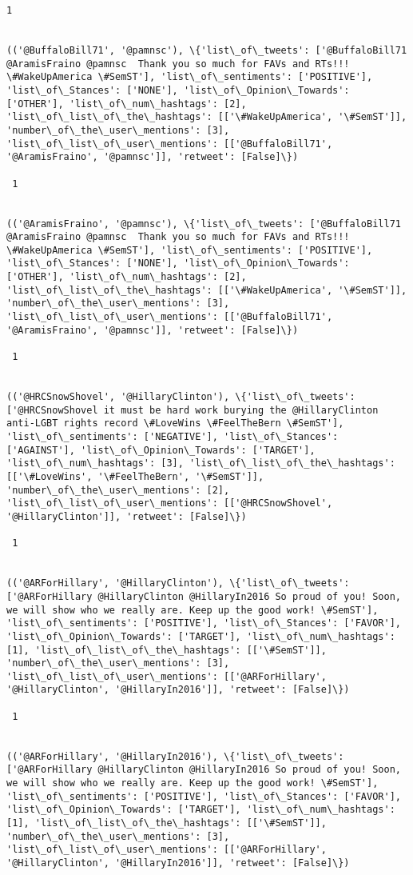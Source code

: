 \documentclass[11pt]{article}
\begin{document}
\begin{Verbatim}[commandchars=\\\{\}]
 1
 

(('@BuffaloBill71', '@pamnsc'), \{'list\_of\_tweets': ['@BuffaloBill71 @AramisFraino @pamnsc  Thank you so much for FAVs and RTs!!! \#WakeUpAmerica \#SemST'], 'list\_of\_sentiments': ['POSITIVE'], 'list\_of\_Stances': ['NONE'], 'list\_of\_Opinion\_Towards': ['OTHER'], 'list\_of\_num\_hashtags': [2], 'list\_of\_list\_of\_the\_hashtags': [['\#WakeUpAmerica', '\#SemST']], 'number\_of\_the\_user\_mentions': [3], 'list\_of\_list\_of\_user\_mentions': [['@BuffaloBill71', '@AramisFraino', '@pamnsc']], 'retweet': [False]\})

 1
 

(('@AramisFraino', '@pamnsc'), \{'list\_of\_tweets': ['@BuffaloBill71 @AramisFraino @pamnsc  Thank you so much for FAVs and RTs!!! \#WakeUpAmerica \#SemST'], 'list\_of\_sentiments': ['POSITIVE'], 'list\_of\_Stances': ['NONE'], 'list\_of\_Opinion\_Towards': ['OTHER'], 'list\_of\_num\_hashtags': [2], 'list\_of\_list\_of\_the\_hashtags': [['\#WakeUpAmerica', '\#SemST']], 'number\_of\_the\_user\_mentions': [3], 'list\_of\_list\_of\_user\_mentions': [['@BuffaloBill71', '@AramisFraino', '@pamnsc']], 'retweet': [False]\})

 1
 

(('@HRCSnowShovel', '@HillaryClinton'), \{'list\_of\_tweets': ['@HRCSnowShovel it must be hard work burying the @HillaryClinton anti-LGBT rights record \#LoveWins \#FeelTheBern \#SemST'], 'list\_of\_sentiments': ['NEGATIVE'], 'list\_of\_Stances': ['AGAINST'], 'list\_of\_Opinion\_Towards': ['TARGET'], 'list\_of\_num\_hashtags': [3], 'list\_of\_list\_of\_the\_hashtags': [['\#LoveWins', '\#FeelTheBern', '\#SemST']], 'number\_of\_the\_user\_mentions': [2], 'list\_of\_list\_of\_user\_mentions': [['@HRCSnowShovel', '@HillaryClinton']], 'retweet': [False]\})

 1
 

(('@ARForHillary', '@HillaryClinton'), \{'list\_of\_tweets': ['@ARForHillary @HillaryClinton @HillaryIn2016 So proud of you! Soon, we will show who we really are. Keep up the good work! \#SemST'], 'list\_of\_sentiments': ['POSITIVE'], 'list\_of\_Stances': ['FAVOR'], 'list\_of\_Opinion\_Towards': ['TARGET'], 'list\_of\_num\_hashtags': [1], 'list\_of\_list\_of\_the\_hashtags': [['\#SemST']], 'number\_of\_the\_user\_mentions': [3], 'list\_of\_list\_of\_user\_mentions': [['@ARForHillary', '@HillaryClinton', '@HillaryIn2016']], 'retweet': [False]\})

 1
 

(('@ARForHillary', '@HillaryIn2016'), \{'list\_of\_tweets': ['@ARForHillary @HillaryClinton @HillaryIn2016 So proud of you! Soon, we will show who we really are. Keep up the good work! \#SemST'], 'list\_of\_sentiments': ['POSITIVE'], 'list\_of\_Stances': ['FAVOR'], 'list\_of\_Opinion\_Towards': ['TARGET'], 'list\_of\_num\_hashtags': [1], 'list\_of\_list\_of\_the\_hashtags': [['\#SemST']], 'number\_of\_the\_user\_mentions': [3], 'list\_of\_list\_of\_user\_mentions': [['@ARForHillary', '@HillaryClinton', '@HillaryIn2016']], 'retweet': [False]\})


\end{Verbatim}
\end{document}
